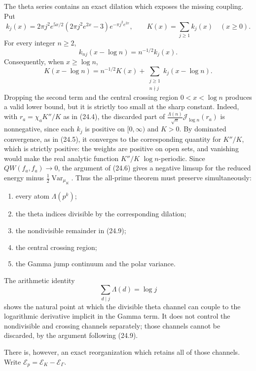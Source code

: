 \documentclass[11pt]{amsart}
\theoremstyle{definition}
\theoremstyle{remark}
\begin{document}
The theta series contains an exact dilation which exposes the missing
coupling.  Put
\[
 k_j(x)=2\pi j^2e^{5x/2}
 \left(2\pi j^2e^{2x}-3\right)e^{-\pi j^2e^{2x}},
 \qquad K(x)=\sum_{j\ge1}k_j(x)
 \quad(x\ge0).
\tag{24.7}
\]
For every integer \(n\ge2\),
\[
 \boxed{k_{nj}(x-\log n)=n^{-1/2}k_j(x).}
\tag{24.8}
\]
Consequently, when \(x\ge\log n\),
\[
 K(x-\log n)
 =n^{-1/2}K(x)
 +\sum_{\substack{j\ge1\\n\nmid j}}
   k_j(x-\log n).
\tag{24.9}
\]
Dropping the second term and the central crossing region
\(0<x<\log n\) produces a valid lower bound, but it is strictly too small at the sharp
constant.  Indeed, with \(r_a=\chi_aK''/K\) as in (24.4), the discarded
part of \(\frac{\Lambda(n)}{\sqrt n}\mathcal J_{\log n}(r_a)\) is
nonnegative, since each \(k_j\) is positive on \([0,\infty)\) and
\(K>0\).  By dominated convergence, as in (24.5), it converges to the
corresponding quantity for \(K''/K\), which is strictly positive: the
weights are positive on open sets, and vanishing would make the real
analytic function \(K''/K\) \(\log n\)-periodic.  Since
\(QW(f_a,f_a)\to0\), the argument of (24.6) gives a negative limsup for
the reduced energy minus \(\tfrac12\operatorname{Var}_{\mu_K}\).  Thus the all-prime theorem must preserve simultaneously:
\begin{enumerate}
\item every atom \(\Lambda(p^k)\);
\item the theta indices divisible by the corresponding dilation;
\item the nondivisible remainder in (24.9);
\item the central crossing region;
\item the Gamma jump continuum and the polar variance.
\end{enumerate}

The arithmetic identity
\[
 \sum_{d\mid j}\Lambda(d)=\log j
\tag{24.10}
\]
shows the natural point at which the divisible theta channel can couple to
the logarithmic derivative implicit in the Gamma term.  It does not control
the nondivisible and crossing channels separately; those channels cannot be
discarded, by the argument following (24.9).

There is, however, an exact reorganization which retains all of those
channels.  Write
\(\mathscr E_p=\mathscr E_K-\mathscr E_\Gamma\).
\end{document}
